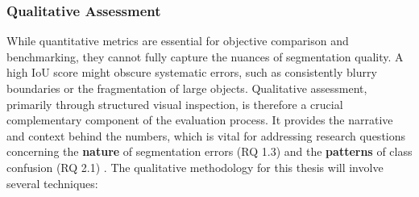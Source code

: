 \documentclass{report}
\begin{document}
\subsubsection{Qualitative Assessment}
\label{sec:qual_assessment}
While quantitative metrics are essential for objective comparison and benchmarking, they cannot fully capture the nuances of segmentation quality. A high IoU score might obscure systematic errors, such as consistently blurry boundaries or the fragmentation of large objects. Qualitative assessment, primarily through structured visual inspection, is therefore a crucial complementary component of the evaluation process. It provides the narrative and context behind the numbers, which is vital for addressing research questions concerning the \textbf{nature} of segmentation errors (RQ 1.3) and the \textbf{patterns} of class confusion (RQ 2.1) \parencites[p.~316f.;]{KotaridisLazaridouRemotesensingimagesegmentationadvancesmetaanalysis2021a}[p.~8f, 13.]{SertelEtAlLandUseLandCoverMappingUsingDeepLearningBasedSegmentationApproachesVHRWorldview3Images2022}.
The qualitative methodology for this thesis will involve several techniques:
\end{document}
